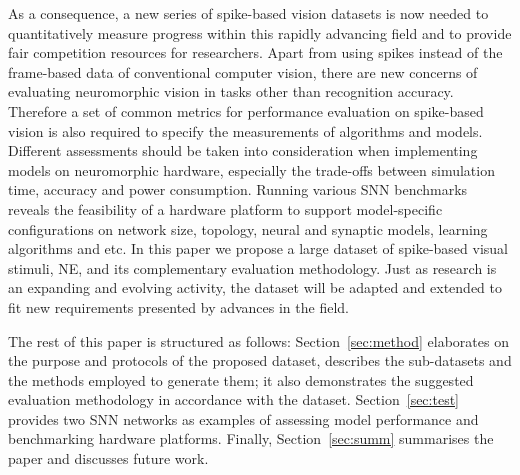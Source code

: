 \documentclass{frontiersENG} %
\begin{document}
As a consequence, a new series of spike-based vision datasets is now needed to quantitatively measure progress within this rapidly advancing field and to provide fair competition resources for researchers.
Apart from using spikes instead of the frame-based data of conventional computer vision, there are new concerns of evaluating neuromorphic vision in tasks other than recognition accuracy.
Therefore a set of common metrics for performance evaluation on spike-based vision is also required to specify the measurements of algorithms and models.
Different assessments should be taken into consideration when implementing models on neuromorphic hardware, especially the trade-offs between simulation time, accuracy and power consumption.
Running various SNN benchmarks reveals the feasibility of a hardware platform to support model-specific configurations on network size, topology, neural and synaptic models, learning algorithms and etc.
In this paper we propose a large dataset of spike-based visual stimuli, NE, and its complementary evaluation methodology.
Just as research is an expanding and evolving activity, the dataset will be adapted and extended to fit new requirements presented by advances in the field.

The rest of this paper is structured as follows: Section~\ref{sec:method} elaborates on the purpose and protocols of the proposed dataset, describes the sub-datasets and the methods employed to generate them; it also demonstrates the suggested evaluation methodology in accordance with the dataset.
Section~\ref{sec:test} provides two SNN networks as examples of assessing model performance and benchmarking hardware platforms.
Finally, Section~\ref{sec:summ} summarises the paper and discusses future work.
\end{document}
